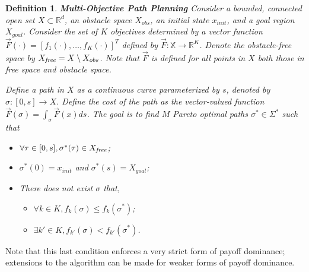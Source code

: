 \documentclass{article}
\newtheorem{defn}{Definition}
\begin{document}
\begin{defn}{ \textbf{Multi-Objective Path Planning} }
Consider a bounded, connected open set $ X \subset \mathbb{R}^{d} $, an obstacle space $ X_{obs} $, an initial state $ x_{init} $, and a goal region $ X_{goal} $. 
Consider the set of $K$ objectives determined by a vector function $ \vec{F}(\cdot) = [ f_{1} (\cdot), \ldots , f_{K}(\cdot) ]^{T}$ defined by $\vec{F}: \mathbb X \rightarrow \mathbb{R}^{K} $. 
Denote the obstacle-free space by $ X_{\it free} = X \setminus X_{obs} $. Note that $\vec{F}$ is defined for all points in $X$ both those in free space and obstacle space.

Define a {\em path} in $X$ as a continuous curve parameterized by $s$, denoted by $\sigma : [0,s] \rightarrow X$. 
Define the cost of the path as the vector-valued function $ \vec{F}(\sigma) = \int_{\sigma} \vec{F}(x)ds $.  
The goal is to find $ M $ Pareto optimal paths $ \sigma^{*} \in \Sigma^{*}$ such that
\begin{itemize}
	\item $\forall \tau\in[0,s], \sigma^*(\tau) \in X_{\it free}$;
	\item $ \sigma^{*} (0) = x_{init} $ and $ \sigma^{*} (s) = X_{goal}  $;
	\item There does not exist $ \sigma $ that,
	\begin{itemize}
		\item $ \forall k \in K, f_{k} (\sigma) \leq f_{k} (\sigma^{*}) $;
		\item $ \exists k' \in K, f_{k'} (\sigma) < f_{k'} (\sigma^{*}) $.
	\end{itemize}
\end{itemize}
\end{defn}
\noindent Note that this last condition enforces a very strict form of payoff dominance; extensions to the algorithm can be made for weaker forms of payoff dominance.
\end{document}
